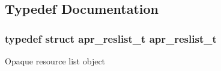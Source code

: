 \subsection{Typedef Documentation}
\hypertarget{group___a_p_r___util___r_l_ga670f6719dfeffe1037e063eaab7b82ac}{
\subsubsection[{apr\-\_\-reslist\-\_\-t}]{\setlength{\rightskip}{0pt plus 5cm}typedef struct {\bf apr\-\_\-reslist\-\_\-t} {\bf apr\-\_\-reslist\-\_\-t}}}\label{group___a_p_r___util___r_l_ga670f6719dfeffe1037e063eaab7b82ac}
Opaque resource list object 

